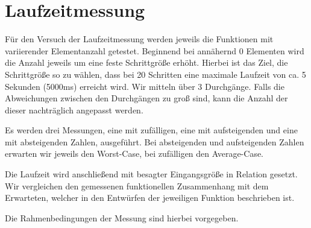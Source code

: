 \documentclass[11pt]{article}
\begin{document}
    \section{Laufzeitmessung}\label{sec:laufzeitmessung}

    Für den Versuch der Laufzeitmessung werden jeweils die Funktionen mit
    variierender Elementanzahl getestet. Beginnend bei
    annähernd 0 Elementen wird die Anzahl jeweils um eine feste Schrittgröße
    erhöht. Hierbei ist das Ziel, die Schrittgröße so zu wählen, dass bei 20
    Schritten eine maximale Laufzeit von ca. 5 Sekunden (5000ms) erreicht
    wird. Wir mitteln über 3 Durchgänge.
    Falls die Abweichungen zwischen den Durchgängen zu groß sind, kann die
    Anzahl der dieser nachträglich angepasst werden.

    Es werden drei Messungen, eine mit zufälligen, eine mit
    aufsteigenden und eine mit absteigenden Zahlen, ausgeführt.
    Bei absteigenden und aufsteigenden Zahlen erwarten wir jeweils den
    Worst-Case, bei zufälligen den Average-Case.

    Die Laufzeit wird anschließend mit besagter Eingangsgröße in Relation gesetzt.
    Wir vergleichen den gemessenen funktionellen Zusammenhang mit dem Erwarteten,
    welcher in den Entwürfen der jeweiligen Funktion beschrieben ist.

    Die Rahmenbedingungen der Messung sind hierbei vorgegeben.
\end{document}
